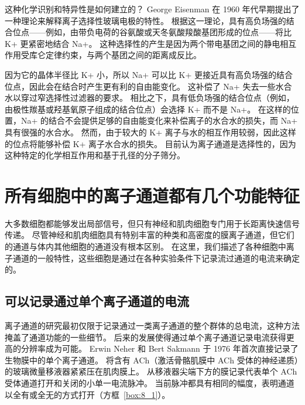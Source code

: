 这种化学识别和特异性是如何建立的？
George Eisenman 在 1960 年代早期提出了一种理论来解释离子选择性玻璃电极的特性。
根据这一理论，具有高负场强的结合位点——例如，由带负电荷的谷氨酸或天冬氨酸羧酸基团形成的位点——将比 K+ 更紧密地结合 Na+。
这种选择性的产生是因为两个带电基团之间的静电相互作用受库仑定律约束，与两个基团之间的距离成反比。


因为它的晶体半径比 K+ 小，所以 Na+ 可以比 K+ 更接近具有高负场强的结合位点，因此会在结合时产生更有利的自由能变化。
这补偿了 Na+ 失去一些水合水以穿过窄选择性过滤器的要求。
相比之下，具有低负场强的结合位点（例如，由极性羰基或羟基氧原子组成的结合位点）会选择 K+ 而不是 Na+。
在这样的位置，Na+ 的结合不会提供足够的自由能变化来补偿离子的水合水的损失，而 Na+ 具有很强的水合水。
然而，由于较大的 K+ 离子与水的相互作用较弱，因此这样的位点将能够补偿 K+ 离子水合水的损失。
目前认为离子通道是选择性的，因为这种特定的化学相互作用和基于孔径的分子筛分。



\section{所有细胞中的离子通道都有几个功能特征}

大多数细胞都能够发出局部信号，但只有神经和肌肉细胞专门用于长距离快速信号传递。
尽管神经和肌肉细胞具有特别丰富的种类和高密度的膜离子通道，但它们的通道与体内其他细胞的通道没有根本区别。
在这里，我们描述了各种细胞中离子通道的一般特性，这些细胞是通过在各种实验条件下记录流过通道的电流来确定的。



\subsection{可以记录通过单个离子通道的电流}

离子通道的研究最初仅限于记录通过一类离子通道的整个群体的总电流，这种方法掩盖了通道功能的一些细节。
后来的发展使得通过单个离子通道记录电流获得更高的分辨率成为可能。
Erwin Neher 和 Bert Sakmann 于 1976 年首次直接记录了生物膜中的单个离子通道。
将含有 ACh（激活骨骼肌膜中 ACh 受体的神经递质）的玻璃微量移液器紧紧压在肌肉膜上。
从移液器尖端下方的膜记录代表单个 ACh 受体通道打开和关闭的小单一电流脉冲。
当前脉冲都具有相同的幅度，表明通道以全有或全无的方式打开（方框~\ref{box:8_1}）。


